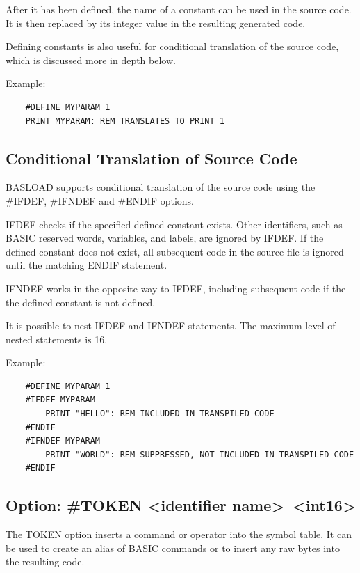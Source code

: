 \documentclass{article}
\begin{document}
        After it has been defined, the name of a constant can be used in
        the source code. It is then replaced by its integer value in the resulting
        generated code.

        Defining constants is also useful for conditional translation of the
        source code, which is discussed more in depth below.

        Example:

        \begin{verbatim}
    #DEFINE MYPARAM 1
    PRINT MYPARAM: REM TRANSLATES TO PRINT 1
        \end{verbatim}
    
    \subsection{Conditional Translation of Source Code}
        
        BASLOAD supports conditional translation of the source code using
        the \#IFDEF, \#IFNDEF and \#ENDIF options.

        IFDEF checks if the specified defined constant exists. Other identifiers,
        such as BASIC reserved words, variables, and labels, are ignored by IFDEF.
        If the defined constant does not exist, all subsequent code in the source
        file is ignored until the matching ENDIF statement.

        IFNDEF works in the opposite way to IFDEF, including subsequent code if the
        the defined constant is not defined.

        It is possible to nest IFDEF and IFNDEF statements. The maximum level of nested
        statements is 16.

        Example:

        \begin{verbatim}
    #DEFINE MYPARAM 1
    #IFDEF MYPARAM
        PRINT "HELLO": REM INCLUDED IN TRANSPILED CODE
    #ENDIF
    #IFNDEF MYPARAM
        PRINT "WORLD": REM SUPPRESSED, NOT INCLUDED IN TRANSPILED CODE
    #ENDIF
        \end{verbatim}
    
    \subsection{Option: \#TOKEN \textless identifier name\textgreater \  \textless int16\textgreater }
        The TOKEN option inserts a command or operator into the symbol table. It can be used
        to create an alias of BASIC commands or to insert any raw bytes into the resulting
        code.
\end{document}
